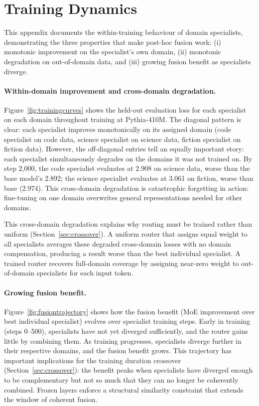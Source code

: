 \documentclass{article}
\begin{document}
\section{Training Dynamics}
\label{app:dynamics}

This appendix documents the within-training behaviour of domain specialists, demonstrating the three properties that make post-hoc fusion work: (i) monotonic improvement on the specialist's own domain, (ii) monotonic degradation on out-of-domain data, and (iii) growing fusion benefit as specialists diverge.

\paragraph{Within-domain improvement and cross-domain degradation.}
Figure~\ref{fig:trainingcurves} shows the held-out evaluation loss for each specialist on each domain throughout training at Pythia-410M. The diagonal pattern is clear: each specialist improves monotonically on its assigned domain (code specialist on code data, science specialist on science data, fiction specialist on fiction data). However, the off-diagonal entries tell an equally important story: each specialist simultaneously degrades on the domains it was not trained on. By step 2,000, the code specialist evaluates at 2.908 on science data, worse than the base model's 2.892; the science specialist evaluates at 3.061 on fiction, worse than base (2.974). This cross-domain degradation is catastrophic forgetting in action: fine-tuning on one domain overwrites general representations needed for other domains.

This cross-domain degradation explains why routing must be trained rather than uniform (Section~\ref{sec:crossover}). A uniform router that assigns equal weight to all specialists averages these degraded cross-domain losses with no domain compensation, producing a result worse than the best individual specialist. A trained router recovers full-domain coverage by assigning near-zero weight to out-of-domain specialists for each input token.

\paragraph{Growing fusion benefit.}
Figure~\ref{fig:fusiontrajectory} shows how the fusion benefit (MoE improvement over best individual specialist) evolves over specialist training steps. Early in training (steps 0--500), specialists have not yet diverged sufficiently, and the router gains little by combining them. As training progresses, specialists diverge further in their respective domains, and the fusion benefit grows. This trajectory has important implications for the training duration crossover (Section~\ref{sec:crossover}): the benefit peaks when specialists have diverged enough to be complementary but not so much that they can no longer be coherently combined. Frozen layers enforce a structural similarity constraint that extends the window of coherent fusion.
\end{document}
